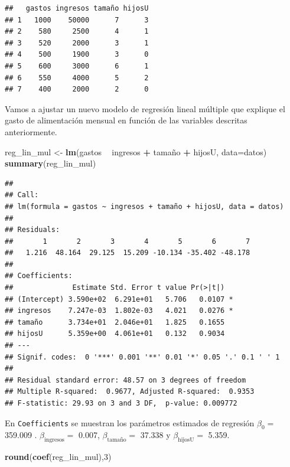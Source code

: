 \documentclass[]{book}
\newenvironment{Shaded}{\begin{snugshade}}{\end{snugshade}}
\newcommand{\KeywordTok}[1]{\textcolor[rgb]{0.13,0.29,0.53}{\textbf{#1}}}
\newcommand{\DataTypeTok}[1]{\textcolor[rgb]{0.13,0.29,0.53}{#1}}
\newcommand{\DecValTok}[1]{\textcolor[rgb]{0.00,0.00,0.81}{#1}}
\newcommand{\StringTok}[1]{\textcolor[rgb]{0.31,0.60,0.02}{#1}}
\newcommand{\OperatorTok}[1]{\textcolor[rgb]{0.81,0.36,0.00}{\textbf{#1}}}
\newcommand{\NormalTok}[1]{#1}
\begin{document}
\begin{verbatim}
##   gastos ingresos tamaño hijosU
## 1   1000    50000      7      3
## 2    580     2500      4      1
## 3    520     2000      3      1
## 4    500     1900      3      0
## 5    600     3000      6      1
## 6    550     4000      5      2
## 7    400     2000      2      0
\end{verbatim}

Vamos a ajustar un nuevo modelo de regresión lineal múltiple que
explique el gasto de alimentación mensual en función de las variables
descritas anteriormente.

\begin{Shaded}
\begin{Highlighting}[]
\NormalTok{reg_lin_mul <-}\StringTok{ }\KeywordTok{lm}\NormalTok{(gastos }\OperatorTok{~}\StringTok{ }\NormalTok{ingresos }\OperatorTok{+}\StringTok{ }\NormalTok{tamaño }\OperatorTok{+}\StringTok{ }\NormalTok{hijosU, }\DataTypeTok{data=}\NormalTok{datos)}
\KeywordTok{summary}\NormalTok{(reg_lin_mul)}
\end{Highlighting}
\end{Shaded}

\begin{verbatim}
## 
## Call:
## lm(formula = gastos ~ ingresos + tamaño + hijosU, data = datos)
## 
## Residuals:
##       1       2       3       4       5       6       7 
##   1.216  48.164  29.125  15.209 -10.134 -35.402 -48.178 
## 
## Coefficients:
##              Estimate Std. Error t value Pr(>|t|)  
## (Intercept) 3.590e+02  6.291e+01   5.706   0.0107 *
## ingresos    7.247e-03  1.802e-03   4.021   0.0276 *
## tamaño      3.734e+01  2.046e+01   1.825   0.1655  
## hijosU      5.359e+00  4.061e+01   0.132   0.9034  
## ---
## Signif. codes:  0 '***' 0.001 '**' 0.01 '*' 0.05 '.' 0.1 ' ' 1
## 
## Residual standard error: 48.57 on 3 degrees of freedom
## Multiple R-squared:  0.9677, Adjusted R-squared:  0.9353 
## F-statistic: 29.93 on 3 and 3 DF,  p-value: 0.009772
\end{verbatim}

En \texttt{Coefficients} se muestran los parámetros estimados de
regresión \(\beta_0=\) 359.009 . \(\beta_{\mbox{ingresos}}=\) 0.007,
\(\beta_{\mbox{tamaño}}=\) 37.338 y \(\beta_{\mbox{hijosU}}=\) 5.359.

\begin{Shaded}
\begin{Highlighting}[]
\KeywordTok{round}\NormalTok{(}\KeywordTok{coef}\NormalTok{(reg_lin_mul),}\DecValTok{3}\NormalTok{)}
\end{Highlighting}
\end{Shaded}
\end{document}
